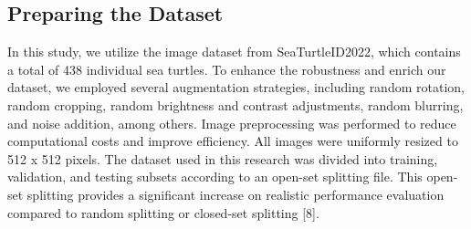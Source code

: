 \documentclass[conference]{IEEEtran}
\begin{document}
\subsection{Preparing the Dataset}
In this study, we utilize the image dataset from SeaTurtleID2022, which contains a total of 438 individual sea turtles. To enhance the robustness and enrich our dataset, we employed several augmentation strategies, including random rotation, random cropping, random brightness and contrast adjustments, random blurring, and noise addition, among others. Image preprocessing was performed to reduce computational costs and improve efficiency. All images were uniformly resized to 512 x 512 pixels. The dataset used in this research was divided into training, validation, and testing subsets according to an open-set splitting file. This open-set splitting provides a significant increase on realistic performance evaluation compared to random splitting or closed-set splitting [8]. 
\end{document}
